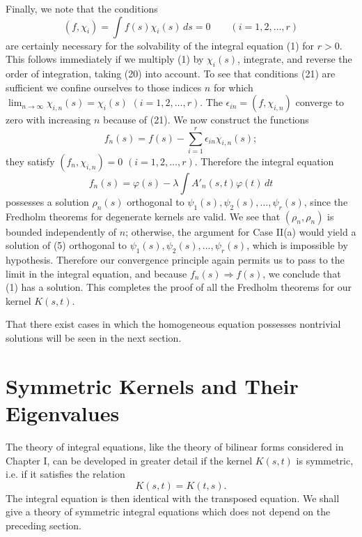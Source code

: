 Finally, we note that the conditions
\begin{equation}\tag{21}
(f,\chi_i)=\int f(s)\chi_i(s)\,ds=0
\qquad (i=1,2,\ldots,r)
\end{equation}
are certainly necessary for the solvability of the integral equation (1) for $r>0$. This follows immediately if we multiply (1) by $\chi_i(s)$, integrate, and reverse the order of integration, taking (20) into account. To see that conditions (21) are sufficient we confine ourselves to those indices $n$ for which $\lim_{n\to\infty}\chi_{i,n}(s)=\chi_i(s)$ $(i=1,2,\ldots,r)$. The $\epsilon_{in}=(f,\chi_{i,n})$ converge to zero with increasing $n$ because of (21). We now construct the functions
\[
f_n(s)=f(s)-\sum_{i=1}^{r}\epsilon_{in}\chi_{i,n}(s);
\]
they satisfy $(f_n,\chi_{i,n})=0$ $(i=1,2,\ldots,r)$. Therefore the integral equation
\begin{equation}\tag{22}
f_n(s)=\varphi(s)-\lambda\int A'_n(s,t)\varphi(t)\,dt
\end{equation}
possesses a solution $\rho_n(s)$ orthogonal to $\psi_1(s),\psi_2(s),\ldots,\psi_r(s)$, since the Fredholm theorems for degenerate kernels are valid. We see that $(\rho_n,\rho_n)$ is bounded independently of $n$; otherwise, the argument for Case II(a) would yield a solution of (5) orthogonal to $\psi_1(s),\psi_2(s),\ldots,\psi_r(s)$, which is impossible by hypothesis. Therefore our convergence principle again permits us to pass to the limit in the integral equation, and because $f_n(s)\Rightarrow f(s)$, we conclude that (1) has a solution. This completes the proof of all the Fredholm theorems for our kernel $K(s,t)$.

That there exist cases in which the homogeneous equation possesses nontrivial solutions will be seen in the next section.

\section{Symmetric Kernels and Their Eigenvalues}
The theory of integral equations, like the theory of bilinear forms considered in Chapter I, can be developed in greater detail if the kernel $K(s,t)$ is symmetric, i.e. if it satisfies the relation
\begin{equation}\tag{23}
K(s,t)=K(t,s).
\end{equation}
The integral equation is then identical with the transposed equation. We shall give a theory of symmetric integral equations which does not depend on the preceding section.

